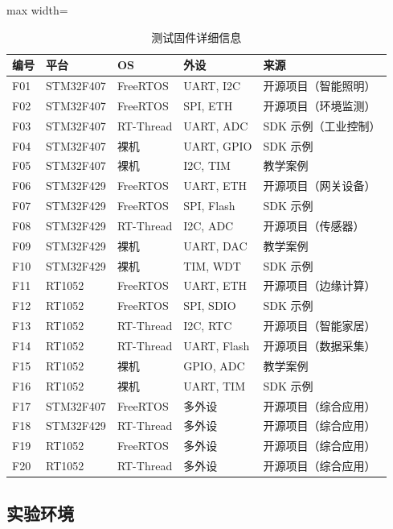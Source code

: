 \begin{table}[htbp]
\centering
\caption{测试固件详细信息}
\label{tab:firmware}
\small
\begin{adjustbox}{max width=\textwidth}
\begin{tabular}{llllp{3cm}}
\toprule
\textbf{编号} & \textbf{平台} & \textbf{OS} & \textbf{外设} & \textbf{来源} \\
\midrule
F01 & STM32F407 & FreeRTOS & UART, I2C & 开源项目（智能照明） \\
F02 & STM32F407 & FreeRTOS & SPI, ETH & 开源项目（环境监测） \\
F03 & STM32F407 & RT-Thread & UART, ADC & SDK 示例（工业控制） \\
F04 & STM32F407 & 裸机 & UART, GPIO & SDK 示例 \\
F05 & STM32F407 & 裸机 & I2C, TIM & 教学案例 \\
F06 & STM32F429 & FreeRTOS & UART, ETH & 开源项目（网关设备） \\
F07 & STM32F429 & FreeRTOS & SPI, Flash & SDK 示例 \\
F08 & STM32F429 & RT-Thread & I2C, ADC & 开源项目（传感器） \\
F09 & STM32F429 & 裸机 & UART, DAC & 教学案例 \\
F10 & STM32F429 & 裸机 & TIM, WDT & SDK 示例 \\
F11 & RT1052 & FreeRTOS & UART, ETH & 开源项目（边缘计算） \\
F12 & RT1052 & FreeRTOS & SPI, SDIO & SDK 示例 \\
F13 & RT1052 & RT-Thread & I2C, RTC & 开源项目（智能家居） \\
F14 & RT1052 & RT-Thread & UART, Flash & 开源项目（数据采集） \\
F15 & RT1052 & 裸机 & GPIO, ADC & 教学案例 \\
F16 & RT1052 & 裸机 & UART, TIM & SDK 示例 \\
F17 & STM32F407 & FreeRTOS & 多外设 & 开源项目（综合应用） \\
F18 & STM32F429 & RT-Thread & 多外设 & 开源项目（综合应用） \\
F19 & RT1052 & FreeRTOS & 多外设 & 开源项目（综合应用） \\
F20 & RT1052 & RT-Thread & 多外设 & 开源项目（综合应用） \\
\bottomrule
\end{tabular}
\end{adjustbox}
\end{table}

\subsection{实验环境}

